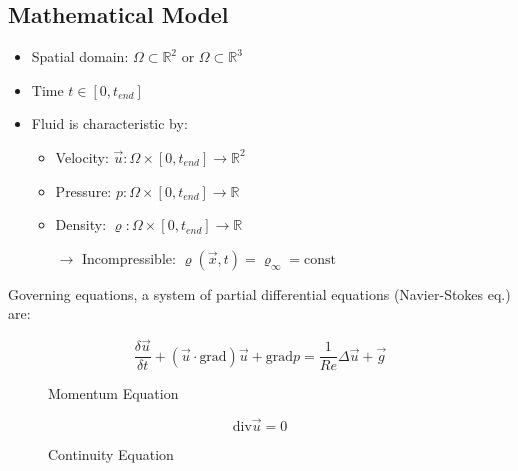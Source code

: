 \documentclass[a4paper,11pt]{scrartcl}
\begin{document}
\subsection{Mathematical Model}
\begin{itemize}
	\item Spatial domain: $\Omega \subset  \mathds{R}^2$ or $\Omega \subset  \mathds{R}^3$
	\item Time $t \in [0, t_{end}]$
	\item Fluid is characteristic by:
	\begin{itemize}
		\item Velocity: $\vec{u} : \Omega \times [0, t_{end}] \rightarrow \mathds{R}^2$
		\item Pressure: $p : \Omega \times [0, t_{end}] \rightarrow \mathds{R}$
		\item Density: $ \varrho : \Omega \times [0, t_{end}] \rightarrow \mathds{R}$
		\item[$\rightarrow$] Incompressible: $\varrho(\vec{x},t) = \varrho_\infty = \text{const}$
	\end{itemize}
\end{itemize}
Governing equations, a system of partial differential equations (Navier-Stokes eq.) are:

\begin{figure}[h]
	\centering
	\[\frac{\delta \vec{u}}{\delta t} + ( \vec{u} \cdot \text{grad}) \vec{u} + \text{grad} p = \frac{1}{Re} \Delta \vec{u} + \vec{g}\]
	\renewcommand{\thefigure}{2.1.a}
    \caption{Momentum Equation}
	\label{fig:momentum}
\end{figure}
\begin{figure}[h]
	\centering
	\[\text{div} \vec{u} = 0\]
	\renewcommand{\thefigure}{2.1.b}
    \caption{Continuity Equation}
	\label{fig:momentum}
\end{figure}
\end{document}
